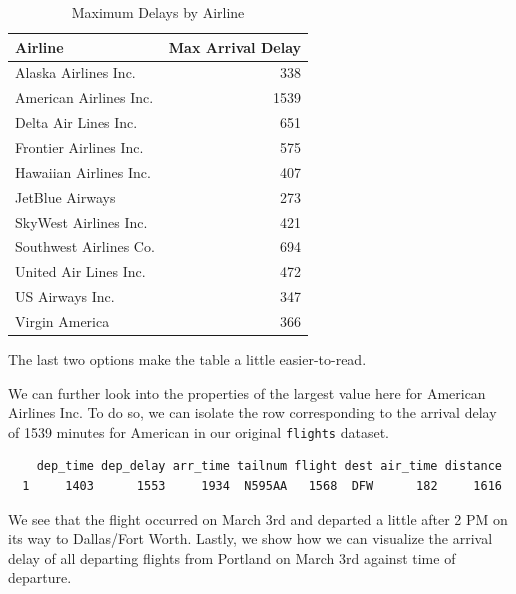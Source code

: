 \documentclass[12pt,twoside]{reedthesis}
\begin{document}
  \begin{longtable}[t]{lr}
  \caption[Max Delays by Airline]{\label{tab:maxdelays}Maximum Delays by Airline}\\
  \toprule
  Airline & Max Arrival Delay\\
  \midrule
  Alaska Airlines Inc. & 338\\
  American Airlines Inc. & 1539\\
  Delta Air Lines Inc. & 651\\
  Frontier Airlines Inc. & 575\\
  Hawaiian Airlines Inc. & 407\\
  \addlinespace
  JetBlue Airways & 273\\
  SkyWest Airlines Inc. & 421\\
  Southwest Airlines Co. & 694\\
  United Air Lines Inc. & 472\\
  US Airways Inc. & 347\\
  Virgin America & 366\\
  \bottomrule
  \end{longtable}
  
  The last two options make the table a little easier-to-read.
  
  We can further look into the properties of the largest value here for
  American Airlines Inc. To do so, we can isolate the row corresponding to
  the arrival delay of 1539 minutes for American in our original
  \texttt{flights} dataset.
  
  \begin{Shaded}
  \end{Shaded}
  
  \begin{verbatim}
    dep_time dep_delay arr_time tailnum flight dest air_time distance
  1     1403      1553     1934  N595AA   1568  DFW      182     1616
  \end{verbatim}
  
  We see that the flight occurred on March 3rd and departed a little after
  2 PM on its way to Dallas/Fort Worth. Lastly, we show how we can
  visualize the arrival delay of all departing flights from Portland on
  March 3rd against time of departure.
  
\end{document}
